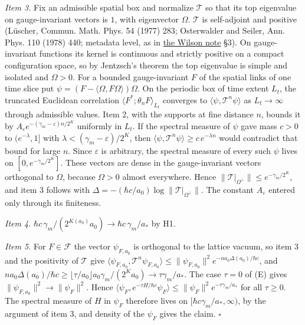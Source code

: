 \documentclass[11pt,a4paper]{article}
\begin{document}
\emph{Item 3.} Fix an admissible spatial box and normalize
\(\mathcal T\) so that its top eigenvalue on gauge-invariant vectors is
\(1\), with eigenvector \(\Omega\). \(\mathcal T\) is self-adjoint and
positive (Lüscher, Commun. Math. Phys. 54 (1977) 283; Osterwalder and
Seiler, Ann. Phys. 110 (1978) 440; metadata level, as in
\href{wilson-strong-coupling-explicit.md}{the Wilson note} §3). On
gauge-invariant functions its kernel is continuous and strictly positive
on a compact configuration space, so by Jentzsch's theorem the top
eigenvalue is simple and isolated and \(\Omega>0\). For a bounded
gauge-invariant \(F\) of the spatial links of one time slice put
\(\psi=(F-\langle\Omega,F\Omega\rangle)\Omega\). On the periodic box of
time extent \(L_t\), the truncated Euclidean correlation
\(\langle F^*;\theta_nF\rangle_{L_t}\) converges to
\(\langle\psi,\mathcal T^n\psi\rangle\) as \(L_t\to\infty\) through
admissible values. Item 2, with the supports at fine distance \(n\),
bounds it by \(A_\varepsilon e^{-(\gamma_m-\varepsilon)n/2^K}\)
uniformly in \(L_t\). If the spectral measure of \(\psi\) gave mass
\(c>0\) to \((e^{-\lambda},1]\) with
\(\lambda<(\gamma_m-\varepsilon)/2^K\), then
\(\langle\psi,\mathcal T^n\psi\rangle\ge c\,e^{-\lambda n}\) would
contradict that bound for large \(n\). Since \(\varepsilon\) is
arbitrary, the spectral measure of every such \(\psi\) lives on
\([0,e^{-\gamma_m/2^K}]\). These vectors are dense in the
gauge-invariant vectors orthogonal to \(\Omega\), because \(\Omega>0\)
almost everywhere. Hence
\(\|\mathcal T|_{\Omega^\perp}\|\le e^{-\gamma_m/2^K}\), and item 3
follows with
\(\Delta=-(\hbar c/a_0)\log\|\mathcal T|_{\Omega^\perp}\|\). The
constant \(A_\varepsilon\) entered only through its finiteness.

\emph{Item 4.}
\(\hbar c\,\gamma_m/(2^{K(a_0)}a_0)\to\hbar c\,\gamma_m/a_*\) by H1.

\emph{Item 5.} For \(F\in\mathcal F\) the vector \(\psi_{F,a_0}\) is
orthogonal to the lattice vacuum, so item 3 and the positivity of
\(\mathcal T\) give
\(\langle\psi_{F,a_0},\mathcal T^n\psi_{F,a_0}\rangle\le\|\psi_{F,a_0}\|^2e^{-na_0\Delta(a_0)/\hbar c}\),
and
\(na_0\Delta(a_0)/\hbar c\ge\lfloor\tau/a_0\rfloor a_0\gamma_m/(2^Ka_0)\to\tau\gamma_m/a_*\).
The case \(\tau=0\) of (E) gives \(\|\psi_{F,a_0}\|^2\to\|\psi_F\|^2\).
Hence
\(\langle\psi_F,e^{-\tau H/\hbar c}\psi_F\rangle\le\|\psi_F\|^2e^{-\tau\gamma_m/a_*}\)
for all \(\tau\ge0\). The spectral measure of \(H\) in \(\psi_F\)
therefore lives on \([\hbar c\gamma_m/a_*,\infty)\), by the argument of
item 3, and density of the \(\psi_F\) gives the claim. \(\square\)
\end{document}
